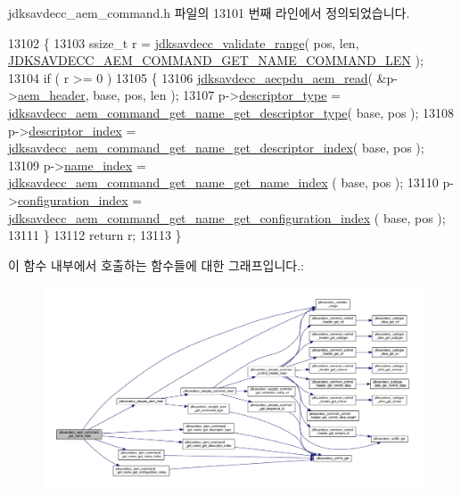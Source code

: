 jdksavdecc\+\_\+aem\+\_\+command.\+h 파일의 13101 번째 라인에서 정의되었습니다.


\begin{DoxyCode}
13102 \{
13103     ssize\_t r = \hyperlink{group__util_ga9c02bdfe76c69163647c3196db7a73a1}{jdksavdecc\_validate\_range}( pos, len, 
      \hyperlink{group__command__get__name_ga12d8b1a1daf6c9b805a6d84f5ecf92cb}{JDKSAVDECC\_AEM\_COMMAND\_GET\_NAME\_COMMAND\_LEN} );
13104     \textcolor{keywordflow}{if} ( r >= 0 )
13105     \{
13106         \hyperlink{group__aecpdu__aem_gae2421015dcdce745b4f03832e12b4fb6}{jdksavdecc\_aecpdu\_aem\_read}( &p->\hyperlink{structjdksavdecc__aem__command__get__name_ae1e77ccb75ff5021ad923221eab38294}{aem\_header}, base, pos, len );
13107         p->\hyperlink{structjdksavdecc__aem__command__get__name_ab7c32b6c7131c13d4ea3b7ee2f09b78d}{descriptor\_type} = 
      \hyperlink{group__command__get__name_ga70f53d4ed25080ab3cc3934fb9946f86}{jdksavdecc\_aem\_command\_get\_name\_get\_descriptor\_type}( 
      base, pos );
13108         p->\hyperlink{structjdksavdecc__aem__command__get__name_a042bbc76d835b82d27c1932431ee38d4}{descriptor\_index} = 
      \hyperlink{group__command__get__name_gafd3e0e1713eef4a60e5f1a6d25571bd6}{jdksavdecc\_aem\_command\_get\_name\_get\_descriptor\_index}( 
      base, pos );
13109         p->\hyperlink{structjdksavdecc__aem__command__get__name_a898a74ada625e0b227dadb02901404e6}{name\_index} = \hyperlink{group__command__get__name_ga85c12d58ce311b3944ac05a3949ac3ff}{jdksavdecc\_aem\_command\_get\_name\_get\_name\_index}
      ( base, pos );
13110         p->\hyperlink{structjdksavdecc__aem__command__get__name_afaad1bd7c66f9611e134d8c5ce98f444}{configuration\_index} = 
      \hyperlink{group__command__get__name_ga9c3952ca18ccf16a029a5cbacb687263}{jdksavdecc\_aem\_command\_get\_name\_get\_configuration\_index}
      ( base, pos );
13111     \}
13112     \textcolor{keywordflow}{return} r;
13113 \}
\end{DoxyCode}


이 함수 내부에서 호출하는 함수들에 대한 그래프입니다.\+:
\nopagebreak
\begin{figure}[H]
\begin{center}
\leavevmode
\includegraphics[width=350pt]{group__command__get__name_ga8a2d9d70c358d74a988ce120f5e40f48_cgraph}
\end{center}
\end{figure}


